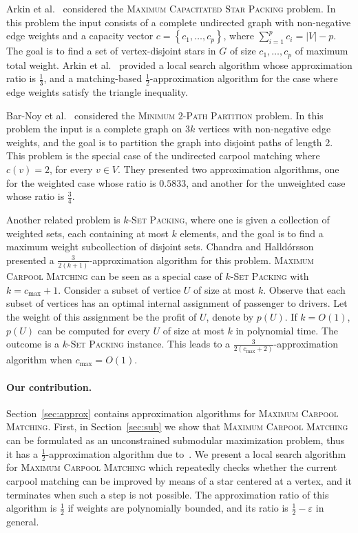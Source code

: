 \documentclass[11pt]{article}
\newcommand{\set}[1]{\left\{ #1 \right\}}
\newcommand{\abs}[1]{\left| #1 \right|}
\newcommand{\half}{\frac{1}{2}}
\newcommand{\inv}[1]{\frac{1}{#1}}
\newcommand{\carpool}{\textsc{Maximum Carpool Matching}\xspace}
\newcommand{\cmax}{c_{\max}}
\newcommand{\eps}{\varepsilon}
\begin{document}
Arkin et al.~\cite{arkin2004approximations} considered
the \textsc{Maximum Capacitated Star Packing} problem.  In this
problem the input consists of a complete undirected graph with
non-negative edge weights and a capacity vector $c
= \set{c_1,\ldots,c_p}$, where $\sum_{i=1}^p c_i = \abs{V} - p$.  The
goal is to find a set of vertex-disjoint stars in $G$ of size
$c_1,\ldots,c_p$ of maximum total weight.  Arkin et
al.~\cite{arkin2004approximations} provided a local search algorithm
whose approximation ratio is $\inv{3}$, and a matching-based
$\half$-approximation algorithm for the case where edge weights
satisfy the triangle inequality.

Bar-Noy et al.~\cite{bar2015improved} considered the
\textsc{Minimum $2$-Path Partition} problem.
In this problem the input is a complete graph on $3k$ vertices with
non-negative edge weights, and the goal is to partition the graph into
disjoint paths of length 2.  This problem is the special case of the
undirected carpool matching where $c(v) = 2$, for every $v \in V$.
They presented two approximation algorithms, one for the weighted case
whose ratio is $0.5833$, and another for the unweighted case whose
ratio is $\frac{3}{4}$.

Another related problem is \textsc{$k$-Set Packing}, where one is
given a collection of weighted sets, each containing at most $k$
elements, and the goal is to find a maximum weight subcollection of
disjoint sets.  Chandra and Halld\'orsson~\cite{chandra2001greedy}
presented a $\frac{3}{2(k+1)}$-approximation algorithm for this
problem.
%
\carpool can be seen as a special case of \textsc{$k$-Set Packing}
with $k = \cmax + 1$.  Consider a subset of vertice $U$ of size at
most $k$.  Observe that each subset of vertices has an optimal
internal assignment of passenger to drivers.  Let the weight of this
assignment be the profit of $U$, denote by $p(U)$.  If $k = O(1)$,
$p(U)$ can be computed for every $U$ of size at most $k$ in polynomial
time.  The outcome is a \textsc{$k$-Set Packing} instance.  This leads
to a $\frac{3}{2(\cmax+2)}$-approximation algorithm
when $\cmax = O(1)$.



\paragraph*{Our contribution.}
%
Section~\ref{sec:approx} contains approximation algorithms
for \carpool.  First, in Section~\ref{sec:sub} we show that \carpool
can be formulated as an unconstrained submodular maximization problem,
thus it has a $\frac{1}{2}$-approximation algorithm due
to~\cite{BFNS15,buchbinder2016deterministic}.
%
We present a local search algorithm for \carpool which repeatedly
checks whether the current carpool matching can be improved by means
of a star centered at a vertex, and it terminates when such a step is
not possible.
%
The approximation ratio of this algorithm is $\half$ if weights are
polynomially bounded, and its ratio is $\half-\eps$ in general.
\end{document}
